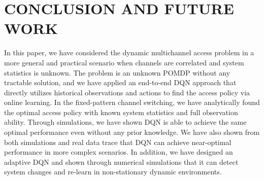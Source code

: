 \section{  CONCLUSION AND FUTURE WORK   }

In this paper, we have considered the dynamic multichannel access problem in a more general and practical scenario when channels are correlated and system statistics is unknown. The problem is an unknown POMDP without any tractable solution, and we have applied an end-to-end DQN approach that directly utilizes historical observations and actions to ﬁnd the access policy via online learning. In the ﬁxed-pattern channel switching, we have analytically found the optimal access policy with known system statistics and full observation ability. Through simulations, we have shown DQN is able to achieve the same optimal performance even without any prior knowledge. We have also shown from both simulations and real data trace that DQN can achieve near-optimal performance in more complex scenarios. In addition, we have designed an adaptive DQN and shown through numerical simulations that it can detect system changes and re-learn in non-stationary dynamic environments.

